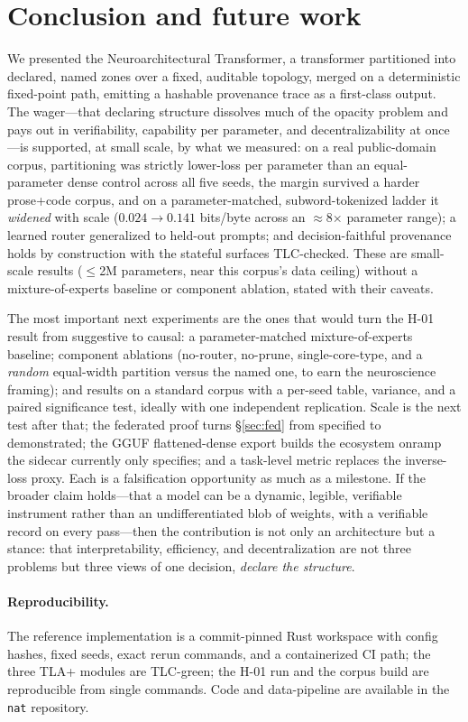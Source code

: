 \documentclass[11pt]{article}
\begin{document}
\section{Conclusion and future work}\label{sec:concl}

We presented the Neuroarchitectural Transformer, a transformer partitioned into declared, named zones
over a fixed, auditable topology, merged on a deterministic fixed-point path, emitting a hashable
provenance trace as a first-class output. The wager---that declaring structure dissolves much of the
opacity problem and pays out in verifiability, capability per parameter, and decentralizability at
once---is supported, at small scale, by what we measured: on a real public-domain corpus, partitioning was
strictly lower-loss per parameter than an equal-parameter dense control across all five seeds, the
margin survived a harder prose+code corpus, and on a parameter-matched, subword-tokenized ladder it
\emph{widened} with scale ($0.024\to0.141$ bits/byte across an $\approx$8$\times$ parameter range); a
learned router generalized to held-out prompts; and decision-faithful provenance holds by
construction with the stateful surfaces TLC-checked. These are small-scale results ($\le$2M
parameters, near this corpus's data ceiling) without a mixture-of-experts baseline or component
ablation, stated with their caveats.

The most important next experiments are the ones that would turn the H-01 result from suggestive to
causal: a parameter-matched mixture-of-experts baseline; component ablations (no-router, no-prune,
single-core-type, and a \emph{random} equal-width partition versus the named one, to earn the
neuroscience framing); and results on a standard corpus with a per-seed table, variance, and a paired
significance test, ideally with one independent replication. Scale is the next test after that; the
federated proof turns \S\ref{sec:fed} from specified to demonstrated; the GGUF flattened-dense export
builds the ecosystem onramp the sidecar currently only specifies; and a task-level metric replaces the
inverse-loss proxy. Each is a falsification opportunity as much as a milestone. If the broader claim
holds---that a model can be a dynamic, legible, verifiable instrument rather than an undifferentiated
blob of weights, with a verifiable record on every pass---then the contribution is not only an
architecture but a stance: that interpretability, efficiency, and decentralization are not three
problems but three views of one decision, \emph{declare the structure}.

\paragraph{Reproducibility.}
The reference implementation is a commit-pinned Rust workspace with config hashes, fixed seeds, exact
rerun commands, and a containerized CI path; the three TLA+ modules are TLC-green; the H-01 run and
the corpus build are reproducible from single commands. Code and data-pipeline are available in the
\texttt{nat} repository.



\end{document}
